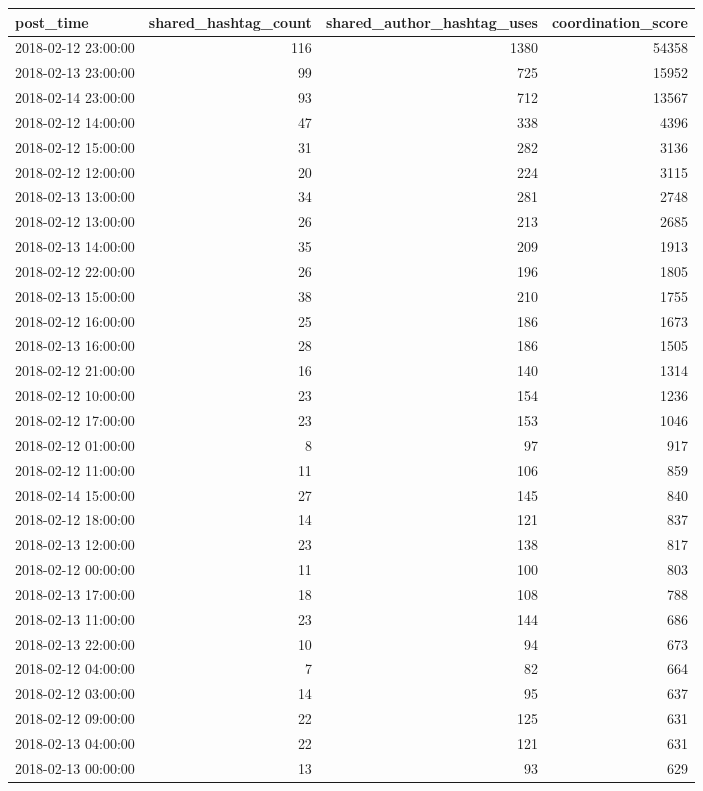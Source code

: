 \begin{tabular}{lrrr}
\toprule
post\_time & shared\_hashtag\_count & shared\_author\_hashtag\_uses & coordination\_score \\
\midrule
2018-02-12 23:00:00 & 116 & 1380 & 54358 \\
2018-02-13 23:00:00 & 99 & 725 & 15952 \\
2018-02-14 23:00:00 & 93 & 712 & 13567 \\
2018-02-12 14:00:00 & 47 & 338 & 4396 \\
2018-02-12 15:00:00 & 31 & 282 & 3136 \\
2018-02-12 12:00:00 & 20 & 224 & 3115 \\
2018-02-13 13:00:00 & 34 & 281 & 2748 \\
2018-02-12 13:00:00 & 26 & 213 & 2685 \\
2018-02-13 14:00:00 & 35 & 209 & 1913 \\
2018-02-12 22:00:00 & 26 & 196 & 1805 \\
2018-02-13 15:00:00 & 38 & 210 & 1755 \\
2018-02-12 16:00:00 & 25 & 186 & 1673 \\
2018-02-13 16:00:00 & 28 & 186 & 1505 \\
2018-02-12 21:00:00 & 16 & 140 & 1314 \\
2018-02-12 10:00:00 & 23 & 154 & 1236 \\
2018-02-12 17:00:00 & 23 & 153 & 1046 \\
2018-02-12 01:00:00 & 8 & 97 & 917 \\
2018-02-12 11:00:00 & 11 & 106 & 859 \\
2018-02-14 15:00:00 & 27 & 145 & 840 \\
2018-02-12 18:00:00 & 14 & 121 & 837 \\
2018-02-13 12:00:00 & 23 & 138 & 817 \\
2018-02-12 00:00:00 & 11 & 100 & 803 \\
2018-02-13 17:00:00 & 18 & 108 & 788 \\
2018-02-13 11:00:00 & 23 & 144 & 686 \\
2018-02-13 22:00:00 & 10 & 94 & 673 \\
2018-02-12 04:00:00 & 7 & 82 & 664 \\
2018-02-12 03:00:00 & 14 & 95 & 637 \\
2018-02-12 09:00:00 & 22 & 125 & 631 \\
2018-02-13 04:00:00 & 22 & 121 & 631 \\
2018-02-13 00:00:00 & 13 & 93 & 629 \\

\end{tabular}
